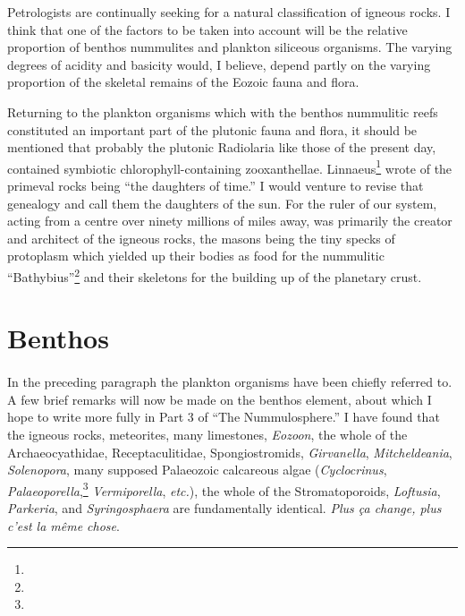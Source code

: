 \documentclass[a4paper, 12pt, oneside]{article}
\begin{document}
Petrologists are continually seeking for a natural classification of igneous rocks. I think that one of the factors to be taken into account will be the relative proportion of benthos nummulites and plankton siliceous organisms. The varying degrees of acidity and basicity would, I believe, depend partly on the varying proportion of the skeletal remains of the Eozoic fauna and flora.

Returning to the plankton organisms which with the benthos nummulitic reefs constituted an important part of the plutonic fauna and flora, it should be mentioned that probably the plutonic Radiolaria like those of the present day, contained symbiotic chlorophyll-containing zooxanthellae. Linnaeus\footnote{} wrote of the primeval rocks being ``the daughters of time.'' I would venture to revise that genealogy and call them the daughters of the sun. For the ruler of our system, acting from a centre over ninety millions of miles away, was primarily the creator and architect of the igneous rocks, the masons being the tiny specks of protoplasm which yielded up their bodies as food for the nummulitic ``Bathybius''\footnote{} and their skeletons for the building up of the planetary crust.
\clearpage
\section{Benthos}
\paragraph{}
In the preceding paragraph the plankton organisms have been chiefly referred to. A few brief remarks will now be made on the benthos element, about which I hope to write more fully in Part 3 of ``The Nummulosphere.'' I have found that the igneous rocks, meteorites, many limestones, \emph{Eozoon}, the whole of the Archaeocyathidae, Receptaculitidae, Spongiostromids, \emph{Girvanella}, \emph{Mitcheldeania}, \emph{Solenopora}, many supposed Palaeozoic calcareous algae (\emph{Cyclocrinus}, \emph{Palaeoporella},\footnote{} \emph{Vermiporella}, \emph{etc.}), the whole of the Stromatoporoids, \emph{Loftusia}, \emph{Parkeria}, and \emph{Syringosphaera} are fundamentally identical. \emph{Plus ça change, plus c'est la même chose}.
\end{document}
